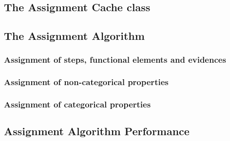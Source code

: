 \subsection{The Assignment Cache class}

\subsection{The Assignment Algorithm}

\subsubsection{Assignment of steps, functional elements and evidences}

\subsubsection{Assignment of non-categorical properties}

\subsubsection{Assignment of categorical properties}

\subsection{Assignment Algorithm Performance}
